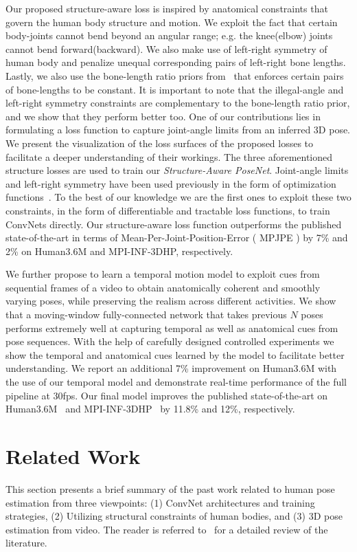 \documentclass[runningheads]{llncs}
\begin{document}
Our proposed structure-aware loss is inspired by anatomical constraints that govern the human body structure and motion. We exploit the fact that certain body-joints cannot bend beyond an angular range; e.g. the knee(elbow) joints cannot bend forward(backward). We also make use of left-right symmetry of human body and penalize unequal corresponding pairs of left-right bone lengths. Lastly, we also use the bone-length ratio priors from~\cite{Zhou_2017_ICCV} that enforces certain pairs of bone-lengths to be constant. It is important to note that the illegal-angle and left-right symmetry constraints are complementary to the bone-length ratio prior, and we show that they perform better too. One of our contributions lies in formulating a loss function to capture joint-angle limits from an inferred 3D pose. We present the visualization of the loss surfaces of the proposed losses to facilitate a deeper understanding of their workings. The three aforementioned structure losses are used to train our \emph{Structure-Aware PoseNet}. Joint-angle limits and left-right symmetry have been used previously in the form of optimization functions~\cite{akhter2015pose,HERDA2005189,bogo2016keep}. To the best of our knowledge we are the first ones to exploit these two constraints, in the form of differentiable and tractable loss functions, to train ConvNets directly. Our structure-aware loss function outperforms the published state-of-the-art in terms of Mean-Per-Joint-Position-Error ( MPJPE ) by 7\% and 2\% on Human3.6M and MPI-INF-3DHP, respectively.

We further propose to learn a temporal motion model to exploit cues from sequential frames of a video to obtain anatomically coherent and smoothly varying poses, while preserving the realism across different activities. We show that a moving-window fully-connected network that takes previous $N$ poses performs extremely well at capturing temporal as well as anatomical cues from pose sequences. With the help of carefully designed controlled experiments we show the temporal and anatomical cues learned by the model to facilitate better understanding. We report an additional 7\% improvement on Human3.6M with the use of our temporal model and demonstrate real-time performance of the full pipeline at 30fps. Our final model improves the published state-of-the-art on Human3.6M~\cite{h36m_pami} and MPI-INF-3DHP~\cite{mono-3dhp2017} by 11.8\% and 12\%, respectively.

\vspace{-1em}
\section{Related Work} \label{sec:relatedWork}
This section presents a brief summary of the past work related to human pose estimation from three viewpoints: (1) ConvNet architectures and training strategies, (2) Utilizing structural constraints of human bodies, and (3) 3D pose estimation from video. The reader is referred to~\cite{SARAFIANOS20161} for a detailed review of the literature.
\end{document}
